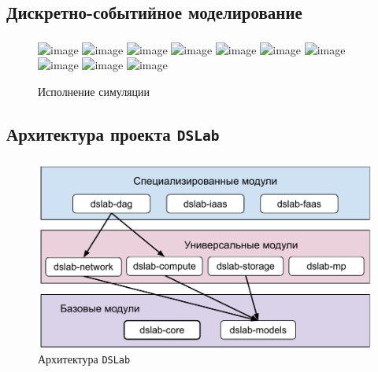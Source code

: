 \documentclass[t]{beamer}  %
\begin{document}
	\subsection{Дискретно-событийное моделирование}

    \begin{frame}
    \frametitle{\insertsection} 
	\framesubtitle{\insertsubsection}

	\begin{figure}
		\centering
		\includegraphics<1>[width=\linewidth]{images/event_pipeline_0}
		\includegraphics<2>[width=\linewidth]{images/event_pipeline_1}
		\includegraphics<3>[width=\linewidth]{images/event_pipeline_2}
		\includegraphics<4>[width=\linewidth]{images/event_pipeline_3}
		\includegraphics<5>[width=\linewidth]{images/event_pipeline_4}
		\includegraphics<6>[width=\linewidth]{images/event_pipeline_5}
		\includegraphics<7>[width=\linewidth]{images/event_pipeline_6}
		\includegraphics<8>[width=\linewidth]{images/event_pipeline_7}
		\includegraphics<9>[width=\linewidth]{images/event_pipeline_8}
		\includegraphics<10>[width=\linewidth]{images/event_pipeline_9}
		\label{simulation}
		\caption*{Исполнение симуляции}
	\end{figure}
        
    \end{frame}

	\subsection{Архитектура проекта \texttt{DSLab}}
	\begin{frame}
		\frametitle{\insertsection} 
		\framesubtitle{\insertsubsection}

		\begin{figure}[H]
			\centering
			\includegraphics[width=0.9\linewidth]{images/dslab_arc}
			\caption*{Архитектура \texttt{DSLab}}
			\label{dslab_arc}
		\end{figure}
	\end{frame}
\end{document}
